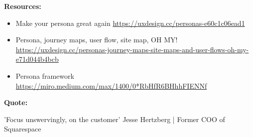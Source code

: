\textbf{Resources:}

\begin{itemize}
\item Make your persona great again \url{https://uxdesign.cc/personas-e60c1c06ead1}
\item Persona, journey maps, user flow, site map, OH MY! \url{https://uxdesign.cc/personas-journey-maps-site-maps-and-user-flows-oh-my-e71d044b4bcb}
\item Persona framework \url{https://miro.medium.com/max/1400/0*RbHfR6BHhhFIENNf}
\end{itemize}

\textbf{Quote:}

'Focus unswervingly, on the customer' Jesse Hertzberg | Former COO of Squarespace

